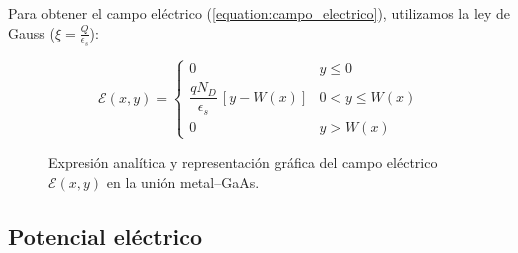 \documentclass[a4paper]{article}
\begin{document}
Para obtener el campo eléctrico (\ref{equation:campo_electrico}), utilizamos la ley de Gauss ($	\xi = \frac{Q}{\epsilon_s}$):


\begin{figure}[h]
	\centering
	
	\begin{minipage}[c]{0.45\textwidth}
		\centering
		\begin{equation}\label{equation:campo_electrico}
			\mathcal{E}(x,y) =
			\begin{cases}
				0 & y \le 0 \\[4pt]
				\dfrac{q N_D}{\epsilon_s}\,[y - W(x)] 
				& 0 < y \le W(x) \\[6pt]
				0 & y > W(x)
			\end{cases}
		\end{equation}
	\end{minipage}
	\hfill
	\begin{minipage}[c]{0.5\textwidth}
		\centering
	\end{minipage}
	
	\caption{Expresión analítica y representación gráfica del campo eléctrico $\mathcal{E}(x,y)$ en la unión metal--GaAs.}
\end{figure}

\subsection{Potencial eléctrico}
\end{document}
